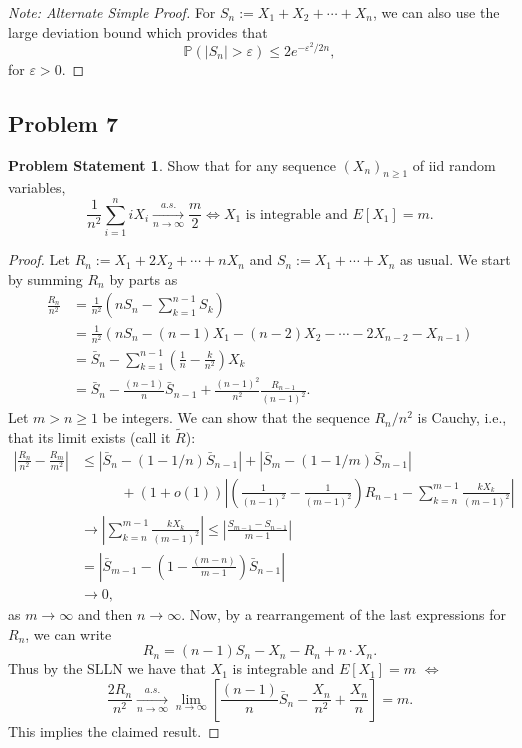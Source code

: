 \documentclass[12pt,reqno]{article}
\theoremstyle{plain}
\theoremstyle{definition}
\newtheorem{problem}[theorem]{Problem Statement}
\newcommand{\PP}[1]{\ensuremath{\mathbb{P}\left(#1\right)}}
\begin{document}
\begin{proof}[Note: Alternate Simple Proof]
For $S_n := X_1+X_2+\cdots+X_n$, we can also use the large deviation bound 
which provides that 
\[
\PP{|S_n| > \varepsilon} \leq 2e^{-\varepsilon^2 / 2n}, 
\]
for $\varepsilon > 0$. 
\end{proof} 

\subsection{Problem 7}

\begin{problem}
Show that for any sequence $(X_n)_{n \geq 1}$ of iid random variables, 
\[
\frac{1}{n^2} \sum_{i=1}^n i X_i \xrightarrow[n \rightarrow \infty]{a.s.} 
     \frac{m}{2} \iff X_1 \text{ is integrable and } E[X_1] = m. 
\]
\end{problem} 
\begin{proof} 
Let $R_n := X_1 + 2X_2+\cdots+nX_n$ and $S_n := X_1+\cdots+X_n$ as usual. 
We start by summing $R_n$ by parts as 
\begin{align*} 
\frac{R_n}{n^2} & = \frac{1}{n^2}\left(n S_n - \sum_{k=1}^{n-1} S_k\right) \\ 
     & = \frac{1}{n^2}\left(n S_n - (n-1)X_1 - (n-2) X_2 - \cdots - 
     2 X_{n-2} - X_{n-1}\right) \\ 
     & = \bar{S}_n - \sum_{k=1}^{n-1} \left(\frac{1}{n} - \frac{k}{n^2} 
     \right) X_k \\ 
     & = \bar{S}_n - \frac{(n-1)}{n} \bar{S}_{n-1} + 
     \frac{(n-1)^2}{n^2} \frac{R_{n-1}}{(n-1)^2}. 
\end{align*} 
Let $m > n \geq 1$ be integers. We can show that the sequence 
$R_n / n^2$ is Cauchy, i.e., that its limit exists (call it $\widetilde{R}$): 
\begin{align*} 
\left\lvert\frac{R_n}{n^2} - \frac{R_m}{m^2}\right\rvert & \leq 
     |\bar{S}_n - (1-1/n) \bar{S}_{n-1}| + |\bar{S}_m - (1-1/m) \bar{S}_{m-1}| \\ 
     & \phantom{==\ } + 
     (1+o(1))\left\lvert \left(\frac{1}{(n-1)^2}-\frac{1}{(m-1)^2}\right) 
     R_{n-1} - \sum_{k=n}^{m-1} \frac{kX_k}{(m-1)^2}\right\rvert \\ 
     & \rightarrow \left\lvert \sum_{k=n}^{m-1} \frac{kX_k}{(m-1)^2} 
     \right\rvert 
     \leq \left\lvert \frac{S_{m-1} - S_{n-1}}{m-1}\right\rvert \\ 
     & = \left\lvert \bar{S}_{m-1} - \left(1-\frac{(m-n)}{m-1}\right) 
     \bar{S}_{n-1}\right\rvert \\ 
     & \rightarrow 0, 
\end{align*} 
as $m \rightarrow \infty$ and then $n \rightarrow \infty$. 
Now, by a rearrangement of the last expressions for $R_n$, we can write 
\[
R_n = (n-1) S_n - X_n - R_n + n \cdot X_n. 
\]
Thus by the SLLN we have that $X_1$ is integrable and $E[X_1] = m$ $\iff$ 
\[
\frac{2R_n}{n^2} \xrightarrow[n \rightarrow \infty]{a.s.} \lim_{n \rightarrow \infty} \left[ 
    \frac{(n-1)}{n} \bar{S}_n - \frac{X_n}{n^2} + \frac{X_n}{n}\right] = m. 
\]
This implies the claimed result. 
\end{proof} 
\end{document}
